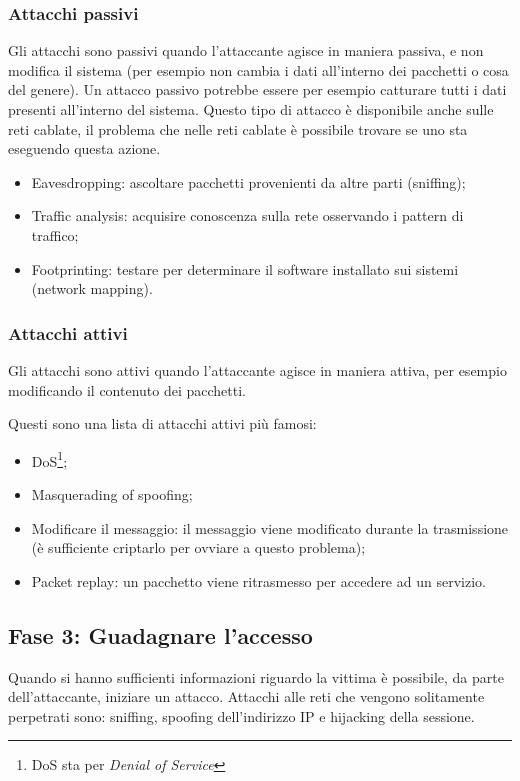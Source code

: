 \subsubsection{Attacchi passivi}

Gli attacchi sono passivi quando l'attaccante agisce in maniera passiva, e non
modifica il sistema (per esempio non cambia i dati all'interno dei pacchetti o
cosa del genere). Un attacco passivo potrebbe essere per esempio catturare
tutti i dati presenti all'interno del sistema. Questo tipo di attacco è
disponibile anche sulle reti cablate, il problema che nelle reti cablate è
possibile trovare se uno sta eseguendo questa azione.

\begin{itemize}
\item Eavesdropping: ascoltare pacchetti provenienti da altre parti (sniffing);
\item Traffic analysis: acquisire conoscenza sulla rete osservando i pattern di
traffico;
\item Footprinting: testare per determinare il software installato sui sistemi
(network mapping).
\end{itemize}

\subsubsection{Attacchi attivi}

Gli attacchi sono attivi quando l'attaccante agisce in maniera attiva, per
esempio modificando il contenuto dei pacchetti.

Questi sono una lista di attacchi attivi più famosi:
\begin{itemize}
\item DoS\footnote{DoS sta per \textit{Denial of Service}};
\item Masquerading of spoofing;
\item Modificare il messaggio: il messaggio viene modificato durante la
trasmissione (è sufficiente criptarlo per ovviare a questo problema);
\item Packet replay: un pacchetto viene ritrasmesso per accedere ad un servizio.
\end{itemize}

\subsection{Fase 3: Guadagnare l'accesso}

Quando si hanno sufficienti informazioni riguardo la vittima è possibile, da
parte dell'attaccante, iniziare un attacco.
Attacchi alle reti che vengono solitamente perpetrati sono: sniffing, spoofing 
dell'indirizzo IP e hijacking della sessione.

